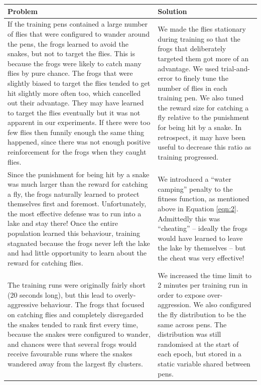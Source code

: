 \hspace*{-0.27in}
\begin{tabular}
{|p{10.7cm}|p{6.8cm}|}
\hline
\textbf{Problem} & \textbf{Solution}\\
\hline
If the training pens contained a large number of flies that were configured to wander around the pens, the frogs learned to avoid the snakes, but not to target the flies. This is because the frogs were likely to catch many flies by pure chance. The frogs that were slightly biased to target the flies tended to get hit slightly more often too, which cancelled out their advantage. They may have learned to target the flies eventually but it was not apparent in our experiments. If there were too few flies then funnily enough the same thing happened, since there was not enough positive reinforcement for the frogs when they caught flies. & We made the flies stationary during training so that the frogs that deliberately targeted them got more of an advantage. We used trial-and-error to finely tune the number of flies in each training pen. We also tuned the reward size for catching a fly relative to the punishment for being hit by a snake. In retrospect, it may have been useful to decrease this ratio as training progressed.\\
\hline
Since the punishment for being hit by a snake was much larger than the reward for catching a fly, the frogs naturally learned to protect themselves first and foremost. Unfortunately, the most effective defense was to run into a lake and stay there! Once the entire population learned this behaviour, training stagnated because the frogs never left the lake and had little opportunity to learn about the reward for catching flies. & We introduced a ``water camping'' penalty to the fitness function, as mentioned above in Equation \ref{eqn:2}. Admittedly this was ``cheating'' -- ideally the frogs would have learned to leave the lake by themselves -- but the cheat was very effective!\\
\hline
The training runs were originally fairly short (20 seconds long), but this lead to overly-aggressive behaviour. The frogs that focused on catching flies and completely disregarded the snakes tended to rank first every time, because the snakes were configured to wander, and chances were that several frogs would receive favourable runs where the snakes wandered away from the largest fly clusters. & We increased the time limit to 2 minutes per training run in order to expose over-aggression. We also configured the fly distribution to be the same across pens. The distribution was still randomised at the start of each epoch, but stored in a static variable shared between pens.\\
\hline
\end{tabular}

